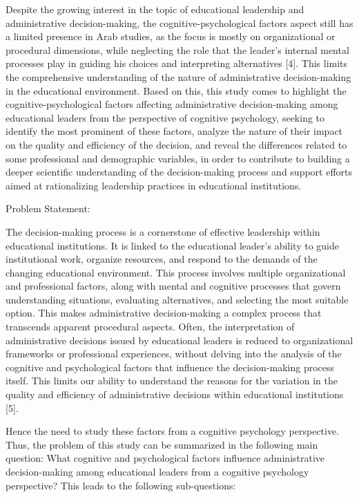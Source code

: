 \documentclass[10pt]{NSP1}
\begin{document}
Despite the growing interest in the topic of educational leadership and administrative decision-making, the cognitive-psychological factors aspect still has a limited presence in Arab studies, as the focus is mostly on organizational or procedural dimensions, while neglecting the role that the leader's internal mental processes play in guiding his choices and interpreting alternatives [4]. This limits the comprehensive understanding of the nature of administrative decision-making in the educational environment. Based on this, this study comes to highlight the cognitive-psychological factors affecting administrative decision-making among educational leaders from the perspective of cognitive psychology, seeking to identify the most prominent of these factors, analyze the nature of their impact on the quality and efficiency of the decision, and reveal the differences related to some professional and demographic variables, in order to contribute to building a deeper scientific understanding of the decision-making process and support efforts aimed at rationalizing leadership practices in educational institutions.

Problem Statement:

The decision-making process is a cornerstone of effective leadership within educational institutions. It is linked to the educational leader's ability to guide institutional work, organize resources, and respond to the demands of the changing educational environment. This process involves multiple organizational and professional factors, along with mental and cognitive processes that govern understanding situations, evaluating alternatives, and selecting the most suitable option. This makes administrative decision-making a complex process that transcends apparent procedural aspects. Often, the interpretation of administrative decisions issued by educational leaders is reduced to organizational frameworks or professional experiences, without delving into the analysis of the cognitive and psychological factors that influence the decision-making process itself. This limits our ability to understand the reasons for the variation in the quality and efficiency of administrative decisions within educational institutions [5].

Hence the need to study these factors from a cognitive psychology perspective. Thus, the problem of this study can be summarized in the following main question: What cognitive and psychological factors influence administrative decision-making among educational leaders from a cognitive psychology perspective? This leads to the following sub-questions:
\end{document}
